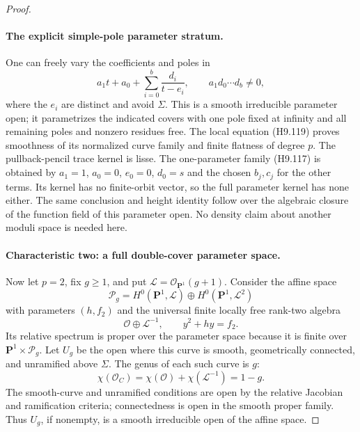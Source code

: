 \begin{proof}
\paragraph{The explicit simple-pole parameter stratum.}
One can freely vary the coefficients and poles in
\[
       a_1 t+a_0+\sum_{i=0}^{b}\frac{d_i}{t-e_i},
 \qquad a_1d_0\cdots d_b\ne0,
                                                               \tag{H9.123}
\]
where the $e_i$ are distinct and avoid $\Sigma$.
This is a smooth irreducible parameter open; it
parametrizes the indicated covers with one pole
fixed at infinity and all remaining poles and
nonzero residues free. The local equation
(H9.119) proves smoothness of its normalized
curve family and finite flatness of degree $p$.
The pullback-pencil trace kernel is lisse.
The one-parameter family (H9.117) is obtained
by $a_1=1$, $a_0=0$, $e_0=0$, $d_0=s$ and
the chosen $b_j,c_j$ for the other terms.
Its kernel has no finite-orbit vector, so the
full parameter kernel has none either.
The same conclusion and height identity follow
over the algebraic closure of the function
field of this parameter open. No density claim
about another moduli space is needed here.

\paragraph{Characteristic two: a full double-cover parameter space.}
Now let $p=2$, fix $g\ge1$, and put
$\mathcal L=\mathcal O_{\mathbf P^1}(g+1)$.
Consider the affine space
\[
 \mathscr P_g=H^0(\mathbf P^1,\mathcal L)
                      \oplus H^0(\mathbf P^1,\mathcal L^2)
\]
with parameters $(h,f_2)$ and the universal
finite locally free rank-two algebra
\[
       \mathcal O\oplus\mathcal L^{-1},
                         \qquad y^2+h y=f_2.
                                                               \tag{H9.124}
\]
Its relative spectrum is proper over the
parameter space because it is finite over
$\mathbf P^1\times\mathscr P_g$.
Let $U_g$ be the open where this curve is smooth,
geometrically connected, and unramified above
$\Sigma$. The genus of each such curve is $g$:
\[
 \chi(\mathcal O_C)
    =\chi(\mathcal O)+\chi(\mathcal L^{-1})
    =1-g.
\]
The smooth-curve and unramified conditions are
open by the relative Jacobian and ramification
criteria; connectedness is open in the smooth
proper family. Thus $U_g$, if nonempty, is a
smooth irreducible open of the affine space.


\end{proof}
